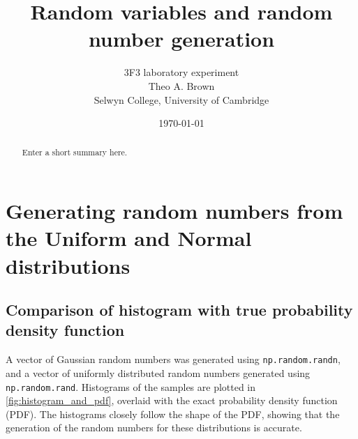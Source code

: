 \documentclass[a4paper]{article}
\begin{document}

\title{Random variables and random number generation}
\author{3F3 laboratory experiment \\ Theo A. Brown \\ Selwyn College, University of Cambridge}
\date{\today}
\maketitle


\begin{abstract}
Enter a short summary here.
\end{abstract}


\section{Generating random numbers from the Uniform and Normal distributions}
\label{sec:uniform_normal}


\subsection{Comparison of histogram with true probability density function}

A vector of Gaussian random numbers was generated using \verb`np.random.randn`, and a vector of uniformly distributed
random numbers generated using \verb`np.random.rand`. Histograms of the samples are plotted in
\autoref{fig:histogram_and_pdf}, overlaid with the exact probability density function (PDF). The histograms closely
follow the shape of the PDF, showing that the generation of the random numbers for these distributions is accurate.
\end{document}
